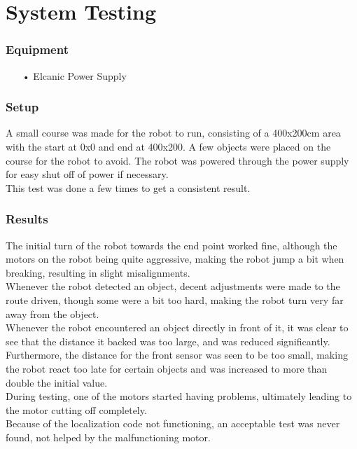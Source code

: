 \section{System Testing}
\subsubsection{Equipment}
\begin{enumerate}
	\item[•]Elcanic Power Supply
\end{enumerate}
\subsubsection{Setup}
A small course was made for the robot to run, consisting of a 400x200cm area with the start at 0x0 and end at 400x200. A few objects were placed on the course for the robot to avoid. The robot was powered through the power supply for easy shut off of power if necessary.\\
This test was done a few times to get a consistent result.
\subsubsection{Results}
The initial turn of the robot towards the end point worked fine, although the motors on the robot being quite aggressive, making the robot jump a bit when breaking, resulting in slight misalignments.\\
Whenever the robot detected an object, decent adjustments were made to the route driven, though some were a bit too hard, making the robot turn very far away from the object.\\ 
Whenever the robot encountered an object directly in front of it, it was clear to see that the distance it backed was too large, and was reduced significantly. Furthermore, the distance for the front sensor was seen to be too small, making the robot react too late for certain objects and was increased to more than double the initial value.\\
During testing, one of the motors started having problems, ultimately leading to the motor cutting off completely.\\
Because of the localization code not functioning, an acceptable test was never found, not helped by the malfunctioning motor. 